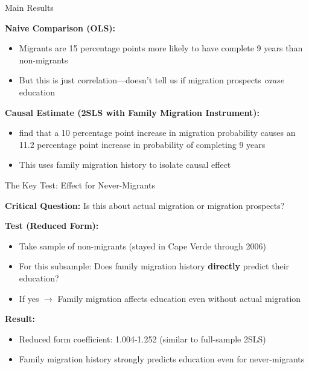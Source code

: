 \documentclass{beamer}
\begin{document}
\begin{frame}{Main Results}

\textbf{Naive Comparison (OLS):}
\begin{itemize}
    \item Migrants are 15 percentage points more likely to have complete 9 years than non-migrants
    \item But this is just correlation—doesn't tell us if migration prospects \textit{cause} education
\end{itemize}

\vspace{0.4cm}

\textbf{Causal Estimate (2SLS with Family Migration Instrument):}
\begin{itemize}
    \item \textcite{batista2012testing} find that a 10 percentage point increase in migration probability causes an 11.2 percentage point increase in probability of completing 9 years
    \item This uses family migration history to isolate causal effect
\end{itemize}

\end{frame}

\begin{frame}{The Key Test: Effect for Never-Migrants}

\textbf{Critical Question:} Is this about actual migration or migration prospects?

\vspace{0.3cm}
\textbf{Test (Reduced Form):}
\begin{itemize}
    \item Take sample of non-migrants (stayed in Cape Verde through 2006)
    \item For this subsample: Does family migration history \textbf{directly} predict their education?
    \item If yes $\rightarrow$ Family migration affects education even without actual migration
\end{itemize}

\vspace{0.3cm}
\textbf{Result:} 
\begin{itemize}
    \item Reduced form coefficient: 1.004-1.252 (similar to full-sample 2SLS)
    \item Family migration history strongly predicts education even for never-migrants
\end{itemize}

\end{frame}
\end{document}
